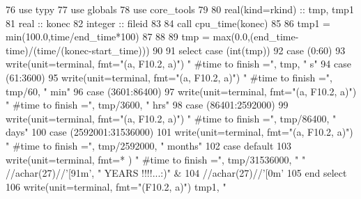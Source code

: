 \begin{DoxyCode}
76       \textcolor{keywordtype}{use }typy
77       \textcolor{keywordtype}{use }globals
78       \textcolor{keywordtype}{use }core_tools
79 
80       \textcolor{keywordtype}{real(kind=rkind)} :: tmp, tmp1
81       \textcolor{keywordtype}{real} :: konec
82       \textcolor{keywordtype}{integer} :: fileid
83 
84       \textcolor{keyword}{call }cpu\_time(konec)
85       
86       tmp1 = min(100.0,time/end_time*100)
87       
88 
89       tmp = max(0.0,(end_time-time)/(time/(konec-start_time)))
90 
91       \textcolor{keywordflow}{select case} (int(tmp))
92         \textcolor{keywordflow}{case} (0:60)   
93           \textcolor{keyword}{write}(unit=terminal, fmt=\textcolor{stringliteral}{"(a, F10.2, a)"}) \textcolor{stringliteral}{" #time to finish ="}, tmp, \textcolor{stringliteral}{" s"}
94         \textcolor{keywordflow}{case} (61:3600)
95           \textcolor{keyword}{write}(unit=terminal, fmt=\textcolor{stringliteral}{"(a, F10.2, a)"}) \textcolor{stringliteral}{" #time to finish ="}, tmp/6\textcolor{comment}{0, }\textcolor{stringliteral}{" min"}
96         \textcolor{keywordflow}{case} (3601:86400)
97           \textcolor{keyword}{write}(unit=terminal, fmt=\textcolor{stringliteral}{"(a, F10.2, a)"}) \textcolor{stringliteral}{" #time to finish ="}, tmp/3\textcolor{comment}{600, }\textcolor{stringliteral}{" hrs"}
98         \textcolor{keywordflow}{case} (86401:2592000)
99           \textcolor{keyword}{write}(unit=terminal, fmt=\textcolor{stringliteral}{"(a, F10.2, a)"}) \textcolor{stringliteral}{" #time to finish ="}, tmp/8\textcolor{comment}{6400, }\textcolor{stringliteral}{" days"}
100         \textcolor{keywordflow}{case} (2592001:31536000) 
101           \textcolor{keyword}{write}(unit=terminal, fmt=\textcolor{stringliteral}{"(a, F10.2, a)"}) \textcolor{stringliteral}{" #time to finish ="}, tmp/2\textcolor{comment}{592000, }\textcolor{stringliteral}{" months"}
102 \textcolor{keywordflow}{        case default}
103           \textcolor{keyword}{write}(unit=terminal, fmt=* ) \textcolor{stringliteral}{" #time to finish ="}, tmp/31536000, \textcolor{stringliteral}{" "} \textcolor{comment}{//achar(27)//}\textcolor{stringliteral}{'[91m'}\textcolor{comment}{,  }\textcolor{stringliteral}{"
       YEARS !!!!...:)"}\textcolor{comment}{ &}
104 \textcolor{comment}{                                                //achar(27)//}\textcolor{stringliteral}{'[0m'}                  
105 \textcolor{keywordflow}{      end select}
106       \textcolor{keyword}{write}(unit=terminal, fmt=\textcolor{stringliteral}{"(F10.2, a)"}) tmp1, \textcolor{stringliteral}{"%
}
\end{DoxyCode}

